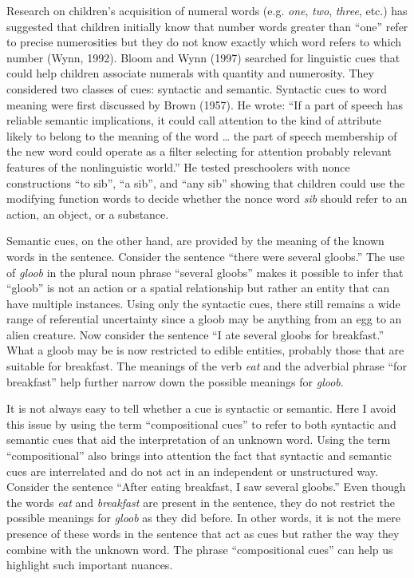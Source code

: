 \documentclass[floatsintext,man]{apa6}
\theoremstyle{definition}
\theoremstyle{definition}
\theoremstyle{definition}
\theoremstyle{remark}
\begin{document}
Research on children's acquisition of numeral words (e.g. \emph{one},
\emph{two}, \emph{three}, etc.) has suggested that children initially
know that number words greater than \enquote{one} refer to precise
numerosities but they do not know exactly which word refers to which
number (Wynn, 1992). Bloom and Wynn (1997) searched for linguistic cues
that could help children associate numerals with quantity and
numerosity. They considered two classes of cues: syntactic and semantic.
Syntactic cues to word meaning were first discussed by Brown (1957). He
wrote: \enquote{If a part of speech has reliable semantic implications,
it could call attention to the kind of attribute likely to belong to the
meaning of the word \ldots{} the part of speech membership of the new
word could operate as a filter selecting for attention probably relevant
features of the nonlinguistic world.} He tested preschoolers with nonce
constructions \enquote{to sib}, \enquote{a sib}, and \enquote{any sib}
showing that children could use the modifying function words to decide
whether the nonce word \emph{sib} should refer to an action, an object,
or a substance.

Semantic cues, on the other hand, are provided by the meaning of the
known words in the sentence. Consider the sentence \enquote{there were
several gloobs.} The use of \emph{gloob} in the plural noun phrase
\enquote{several gloobs} makes it possible to infer that \enquote{gloob}
is not an action or a spatial relationship but rather an entity that can
have multiple instances. Using only the syntactic cues, there still
remains a wide range of referential uncertainty since a gloob may be
anything from an egg to an alien creature. Now consider the sentence
\enquote{I ate several gloobs for breakfast.} What a gloob may be is now
restricted to edible entities, probably those that are suitable for
breakfast. The meanings of the verb \emph{eat} and the adverbial phrase
\enquote{for breakfast} help further narrow down the possible meanings
for \emph{gloob}.

It is not always easy to tell whether a cue is syntactic or semantic.
Here I avoid this issue by using the term \enquote{compositional cues}
to refer to both syntactic and semantic cues that aid the interpretation
of an unknown word. Using the term \enquote{compositional} also brings
into attention the fact that syntactic and semantic cues are
interrelated and do not act in an independent or unstructured way.
Consider the sentence \enquote{After eating breakfast, I saw several
gloobs.} Even though the words \emph{eat} and \emph{breakfast} are
present in the sentence, they do not restrict the possible meanings for
\emph{gloob} as they did before. In other words, it is not the mere
presence of these words in the sentence that act as cues but rather the
way they combine with the unknown word. The phrase
\enquote{compositional cues} can help us highlight such important
nuances.
\end{document}

